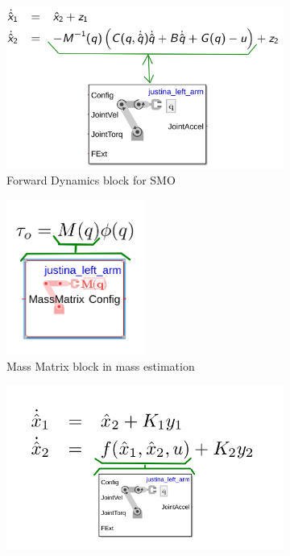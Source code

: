 \documentclass[a4paper, 10pt]{article}
\begin{document}
\begin{figure}
  \centering
  \begin{subfigure}{0.45\textwidth}
  \centering
  \includegraphics[width=\textwidth]{Figures/SMOwithSimulink.png}
  \caption{Forward Dynamics block for SMO}
  \label{fig:SimulinkSMO}
  \end{subfigure}
  \hfill
  \begin{subfigure}{0.48\textwidth}
  \centering
  \includegraphics[width=0.5\textwidth]{Figures/MassEst.png}
  \caption{Mass Matrix block in mass estimation}
  \label{fig:SimulinkMassEst}
  \end{subfigure}
  \begin{subfigure}{0.45\textwidth}
  \centering
  \includegraphics[width=\textwidth]{Figures/EKFSimulink.png}

\end{subfigure}
\end{figure}
\end{document}
